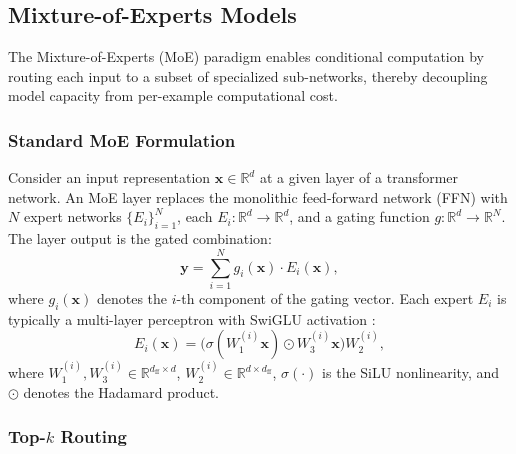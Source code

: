 \documentclass[11pt,a4paper]{article}
\newcommand{\R}{\mathbb{R}}
\begin{document}
\subsection{Mixture-of-Experts Models}

The Mixture-of-Experts (MoE) paradigm \citep{jacobs1991adaptive} enables conditional computation by routing each input to a subset of specialized sub-networks, thereby decoupling model capacity from per-example computational cost.

\subsubsection{Standard MoE Formulation}

Consider an input representation $\mathbf{x} \in \R^d$ at a given layer of a transformer network. An MoE layer replaces the monolithic feed-forward network (FFN) with $N$ expert networks $\{E_i\}_{i=1}^{N}$, each $E_i: \R^d \to \R^d$, and a gating function $g: \R^d \to \R^N$. The layer output is the gated combination:
\begin{equation}\label{eq:moe_output}
    \mathbf{y} = \sum_{i=1}^{N} g_i(\mathbf{x}) \cdot E_i(\mathbf{x}),
\end{equation}
where $g_i(\mathbf{x})$ denotes the $i$-th component of the gating vector. Each expert $E_i$ is typically a multi-layer perceptron with SwiGLU activation \citep{shazeer2017outrageously}:
\begin{equation}
    E_i(\mathbf{x}) = \bigl(\sigma(W_{1}^{(i)} \mathbf{x}) \odot W_{3}^{(i)} \mathbf{x}\bigr) W_{2}^{(i)},
\end{equation}
where $W_{1}^{(i)}, W_{3}^{(i)} \in \R^{d_{\mathrm{ff}} \times d}$, $W_{2}^{(i)} \in \R^{d \times d_{\mathrm{ff}}}$, $\sigma(\cdot)$ is the SiLU nonlinearity, and $\odot$ denotes the Hadamard product.

\subsubsection{Top-$k$ Routing}
\end{document}
